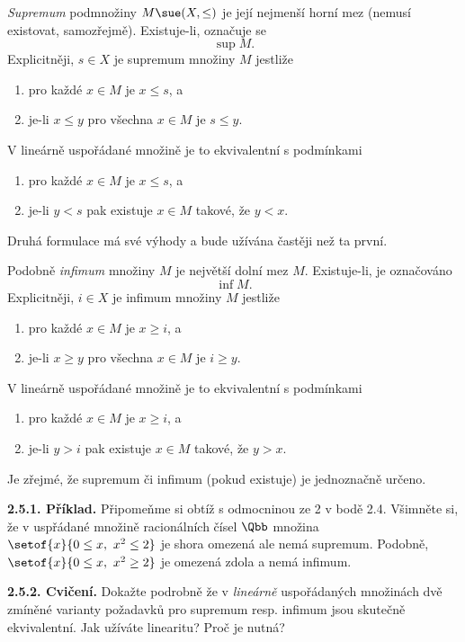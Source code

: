 \documentclass[12pt]{article}
\begin{document}
{\em Supremum} podmnožiny $M\sue (X,\leq)$ je její nejmenší horní mez (nemusí existovat, samozřejmě). Existuje-li, označuje se
$$
\sup M.
$$
Explicitněji, $s\in X$ je supremum množiny $M$ jestliže
\begin{enumerate}
\item pro každé $x\in M$ je  $x\leq s$, a
\item je-li $x\leq y$ pro všechna $x\in M$ je $s\leq y$.
\end{enumerate}
V lineárně uspořádané množině je to ekvivalentní s podmínkami
\begin{enumerate}
\item pro každé $x\in M$ je $x\leq s$, a
\item je-li $y<s$  pak existuje $x\in M$ takové, že $y<x$.
\end{enumerate}
Druhá formulace má své výhody a bude užívána častěji než ta první.
 
 \medskip
 
Podobně {\em infimum} množiny $M$ je největší dolní mez $M$. Existuje-li, je označováno
$$
\inf M.
$$
Explicitněji, $i\in X$ je infimum množiny $M$ jestliže
\begin{enumerate}
\item pro každé $x\in M$ je  $x\geq i$, a
\item je-li $x\geq y$ pro všechna $x\in M$ je $i\geq y$.
\end{enumerate}
V lineárně uspořádané množině je to ekvivalentní s podmínkami
\begin{enumerate}
\item pro každé $x\in M$ je $x\geq i$, a
\item je-li $y>i$  pak existuje $x\in M$ takové, že $y>x$.
\end{enumerate}


\medskip

Je zřejmé, že supremum či infimum (pokud existuje) je jednoznačně určeno.

\medskip

{\bf 2.5.1. Příklad.} Připomeňme si obtíž s odmocninou ze 2 v bodě 2.4. Všimněte si, že v uspřádané množině racionálních čísel
$\Qbb$ množina $\setof{x}{0\leq x, \ x^2\leq 2}$ je shora omezená ale nemá supremum.
Podobně, $\setof{x}{0\leq x, \ x^2\geq 2}$ je omezená zdola a nemá infimum.

\medskip

{\bf 2.5.2. Cvičení.} Dokažte podrobně že v  {\em lineárně} uspořádaných množinách dvě zmíněné varianty  požadavků pro supremum resp. infimum jsou skutečně ekvivalentní. Jak užíváte linearitu? Proč je nutná?
\end{document}
